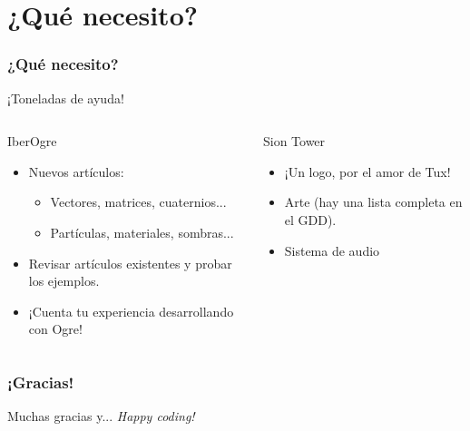 \documentclass[green]{beamer}
\begin{document}
\section{¿Qué necesito?}

\begin{frame}
	\frametitle{¿Qué necesito?}
    
    \begin{center}
        ¡Toneladas de ayuda!
    \end{center}
    
    {\footnotesize
    \begin{columns}[t]
		\column{150pt}
    
		\begin{block}{IberOgre}
            \begin{itemize}
                \item Nuevos artículos:
                \begin{itemize}
                    \item Vectores, matrices, cuaternios...
                    \item Partículas, materiales, sombras...
                \end{itemize}
                \item Revisar artículos existentes y probar los ejemplos.
                \item ¡Cuenta tu experiencia desarrollando con Ogre!
            \end{itemize}           
        \end{block}

		\column{150pt}
        
		\begin{block}{Sion Tower}
            \begin{itemize}
                \item ¡Un logo, por el amor de Tux!
                \item Arte (hay una lista completa en el GDD).
                \item Sistema de audio
            \end{itemize}            
        \end{block}
	\end{columns} 
	}
\end{frame}

\begin{frame}
	\frametitle{¡Gracias!}
    
    \begin{center}
        Muchas gracias y... \emph{Happy coding!}
    \end{center}
\end{frame}
\end{document}
